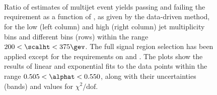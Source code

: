 \begin{figure}[!h]
  \centering
   \\
   \\
   \\
  \caption{Ratio of estimates of multijet event yields passing and
    failing the \mhtmet requirement as a function of \alphat, as given
    by the data-driven method, for the low (left column) and high
    (right column) jet multiplicity bins and different \scalht bins
    (rows) within the range $200 < \scalht < 375\gev$. The full signal
    region selection has been applied except for the requirements on
    \mhtmet and \alphat. The plots show the results of linear and
    exponential fits to the data points within the range $0.505 <
    \alphat < 0.550$, along with their uncertainties (bands) and
    values for $\chi^2 / \textrm{dof}$.}
  \label{fig:}
\end{figure}

